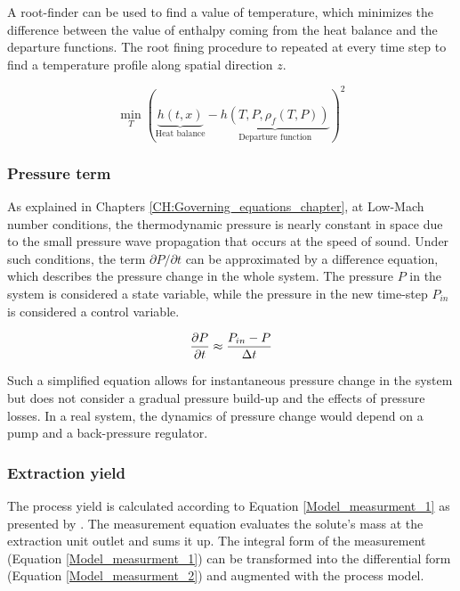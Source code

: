 \documentclass[../Article_Model_Parameters.tex]{subfiles}
\begin{document}
			A root-finder can be used to find a value of temperature, which minimizes the difference between the value of enthalpy coming from the heat balance and the departure functions. The root fining procedure to repeated at every time step to find a temperature profile along spatial direction $z$.
			
			{\footnotesize
				\begin{equation}
					\min_T \left( \underbrace{h\left(t,x\right)}_{\text{Heat balance}} - \underbrace{h\left(T,P,\rho_f\left(T,P\right)\right)}_{\text{Departure function}} \right)^2
					\label{EQ:Enthalpy_root}
				\end{equation}
			}

            \subsubsection{Pressure term} \label{CH: Pressure}
			
			As explained in Chapters \ref{CH:Governing_equations_chapter}, at Low-Mach number conditions, the thermodynamic pressure is nearly constant in space due to the small pressure wave propagation that occurs at the speed of sound. Under such conditions, the term $\partial P/\partial t$ can be approximated by a difference equation, which describes the pressure change in the whole system. The pressure $P$ in the system is considered a state variable, while the pressure in the new time-step $P_{in}$ is considered a control variable.
			
			{\footnotesize
				\begin{equation}
					\frac{\partial {\color{black}P}}{\partial t} \approx \frac{{\color{black}P_{in}} - {\color{black}P} }{\Delta t}
			\end{equation}}
			
			Such a simplified equation allows for instantaneous pressure change in the system but does not consider a gradual pressure build-up and the effects of pressure losses. In a real system, the dynamics of pressure change would depend on a pump and a back-pressure regulator.
			
			\subsubsection{Extraction yield} \label{CH: Yield}
			
			The process yield is calculated according to Equation \ref{Model_measurment_1} as presented by \citet{Sovova1994a}. The measurement equation evaluates the solute's mass at the extraction unit outlet and sums it up. The integral form of the measurement (Equation \ref{Model_measurment_1}) can be transformed into the differential form (Equation \ref{Model_measurment_2}) and augmented with the process model.
			
\end{document}
